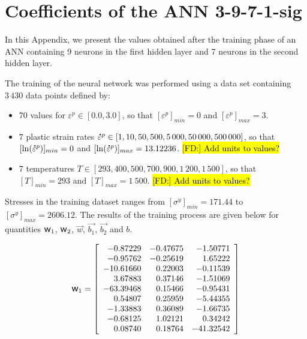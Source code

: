\documentclass[preprint,12pt,times]{elsarticle}
\newcommand{\w}{\mbox{\large\ensuremath{\mathsf{w}}}}
\newcommand{\mdot}[1]{\accentset{\mbox{\bfseries .}}{#1}}
\DeclareRobustCommand{\FD}[1]{ {\begingroup\sethlcolor{VWgreen}\textcolor{black}{\hl{[FD:] #1}}\endgroup} }
\begin{document}
\section{Coefficients of the ANN 3-9-7-1-sig\label{sec:appendix-1}}

In this Appendix, we present the values obtained after the training phase of an ANN containing 9 neurons in the first hidden layer and 7 neurons in the second hidden layer.

The training of the neural network was performed using a data set containing $3\,430$ data points defined by:
\begin{itemize}
\item $70$ values for $\varepsilon^p\in[0.0,3.0]$, so that $[\varepsilon^p]_{min}=0$ and $[\varepsilon^p]_{max}=3$.
\item $7$ plastic strain rates $\mdot{\varepsilon}^p\in[1, 10, 50, 500, 5\,000, 50\,000, 500\,000]$, so that $[\ln(\mdot{\varepsilon}^p)]_{min}=0$ and $[\ln(\mdot{\varepsilon}^p)]_{max}=13.12236$. \FD{Add units to values?}
\item  $7$ temperatures $T\in[293, 400, 500, 700, 900, 1\,200, 1\,500]$, so that $[T]_{min}=293$ and $[T]_{max}=1\ 500$. \FD{Add units to values?}
\end{itemize}

Stresses in the training dataset ranges from $[\sigma^y]_{min}=171.44$ to $[\sigma^y]_{max}=2606.12$.
The results of the training process are given below for quantities $\w_1$, $\w_2$, $\overrightarrow{w}$, $\overrightarrow{b_1}$, $\overrightarrow{b_2}$ and $b$.

\begin{equation*}
\w_1=\left[
\begin{array}{rrr}
 -0.87229 & -0.47675 & -1.50771\\
 -0.95762 & -0.25619 &  1.65222\\
 -10.61660 &  0.22003 & -0.11539\\
  3.67883 &  0.37146 & -1.51069\\
 -63.39468 &  0.15466 & -0.95431\\
  0.54807 &  0.25959 & -5.44355\\
 -1.33883 &  0.36089 & -1.66735\\
 -0.68125 &  1.02121 &  0.34242\\
  0.08740 &  0.18764 & -41.32542
\end{array}\right]
\end{equation*}
\end{document}
